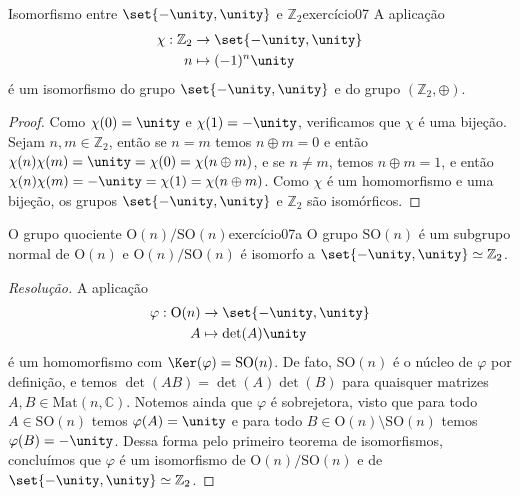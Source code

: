 \begin{lemma}{Isomorfismo entre \(\set{-\unity, \unity}\) e \(\mathbb{Z}_2\)}{exercício07}
    A aplicação
    \begin{align*}
        \chi : \mathbb{Z}_2 &\to \set{-\unity, \unity}\\
                          n &\mapsto (-1)^n \unity
    \end{align*}
    é um isomorfismo do grupo \(\set{-\unity, \unity}\) e do grupo \((\mathbb{Z}_2, \oplus)\).
\end{lemma}
\begin{proof}
    Como \(\chi(0) = \unity\) e \(\chi(1) = -\unity\), verificamos que \(\chi\) é uma bijeção. Sejam \(n, m \in \mathbb{Z}_2\), então se \(n = m\) temos \(n \oplus m = 0\) e então \(\chi(n)\chi(m) = \unity = \chi(0) = \chi(n \oplus m)\), e se \(n \neq m\), temos \(n \oplus m = 1\), e então \(\chi(n)\chi(m) = - \unity = \chi(1) = \chi(n \oplus m)\). Como \(\chi\) é um homomorfismo e uma bijeção, os grupos \(\set{-\unity, \unity}\) e \(\mathbb{Z}_2\) são isomórficos.
\end{proof}

\begin{proposition}{O grupo quociente \(\mathrm{O}(n)/\mathrm{SO}(n)\)}{exercício07a}
    O grupo \(\mathrm{SO}(n)\) é um subgrupo normal de \(\mathrm{O}(n)\) e \(\mathrm{O}(n)/\mathrm{SO}(n)\) é isomorfo a \(\set{-\unity, \unity} \simeq \mathbb{Z}_2\).
\end{proposition}
\begin{proof}[Resolução]
    A aplicação
    \begin{align*}
        \varphi : \mathrm{O}(n) &\to \set{-\unity, \unity}\\
                              A &\mapsto \det(A) \unity
    \end{align*}
    é um homomorfismo com \(\Ker(\varphi) = \mathrm{SO}(n)\). De fato, \(\mathrm{SO}(n)\) é o núcleo de \(\varphi\) por definição, e temos \(\det(AB)=\det(A)\det(B)\) para quaisquer matrizes \(A,B \in \mathrm{Mat}(n,\mathbb{C})\). Notemos ainda que \(\varphi\) é sobrejetora, visto que para todo \(A \in \mathrm{SO}(n)\) temos \(\varphi(A) = \unity\) e para todo \(B \in \mathrm{O}(n) \setminus \mathrm{SO}(n)\) temos \(\varphi(B) = -\unity\). Dessa forma pelo primeiro teorema de isomorfismos, concluímos que \(\varphi\) é um isomorfismo de \(\mathrm{O}(n)/\mathrm{SO}(n)\) e de \(\set{-\unity, \unity}\simeq \mathbb{Z}_2\).
\end{proof}

